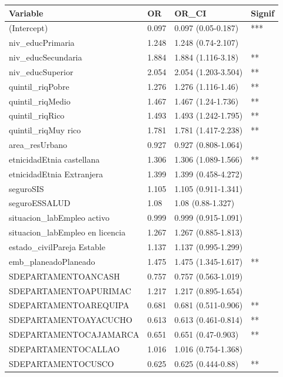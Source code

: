 \begin{tabular}{llll}
  \toprule
Variable & OR & OR\_CI & Signif \\ 
  \midrule
(Intercept) & 0.097 & 0.097 (0.05-0.187) & *** \\ 
  niv\_educPrimaria & 1.248 & 1.248 (0.74-2.107) &  \\ 
  niv\_educSecundaria & 1.884 & 1.884 (1.116-3.18) & ** \\ 
  niv\_educSuperior & 2.054 & 2.054 (1.203-3.504) & ** \\ 
  quintil\_riqPobre & 1.276 & 1.276 (1.116-1.46) & ** \\ 
  quintil\_riqMedio & 1.467 & 1.467 (1.24-1.736) & ** \\ 
  quintil\_riqRico & 1.493 & 1.493 (1.242-1.795) & ** \\ 
  quintil\_riqMuy rico & 1.781 & 1.781 (1.417-2.238) & ** \\ 
  area\_resUrbano & 0.927 & 0.927 (0.808-1.064) &  \\ 
  etnicidadEtnia castellana & 1.306 & 1.306 (1.089-1.566) & ** \\ 
  etnicidadEtnia Extranjera & 1.399 & 1.399 (0.458-4.272) &  \\ 
  seguroSIS & 1.105 & 1.105 (0.911-1.341) &  \\ 
  seguroESSALUD & 1.08 & 1.08 (0.88-1.327) &  \\ 
  situacion\_labEmpleo activo & 0.999 & 0.999 (0.915-1.091) &  \\ 
  situacion\_labEmpleo en licencia & 1.267 & 1.267 (0.885-1.813) &  \\ 
  estado\_civilPareja Estable & 1.137 & 1.137 (0.995-1.299) &  \\ 
  emb\_planeadoPlaneado & 1.475 & 1.475 (1.345-1.617) & ** \\ 
  SDEPARTAMENTOANCASH & 0.757 & 0.757 (0.563-1.019) &  \\ 
  SDEPARTAMENTOAPURIMAC & 1.217 & 1.217 (0.895-1.654) &  \\ 
  SDEPARTAMENTOAREQUIPA & 0.681 & 0.681 (0.511-0.906) & ** \\ 
  SDEPARTAMENTOAYACUCHO & 0.613 & 0.613 (0.461-0.814) & ** \\ 
  SDEPARTAMENTOCAJAMARCA & 0.651 & 0.651 (0.47-0.903) & ** \\ 
  SDEPARTAMENTOCALLAO & 1.016 & 1.016 (0.754-1.368) &  \\ 
  SDEPARTAMENTOCUSCO & 0.625 & 0.625 (0.444-0.88) & ** \\ 

\end{tabular}
